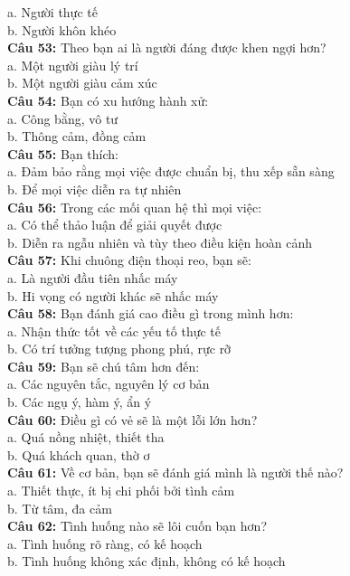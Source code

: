 \begin{multicols}{2}
a. Người thực tế \\
b. Người khôn khéo \\
\textbf{Câu 53:} Theo bạn ai là người đáng được khen ngợi hơn? \\
a. Một người giàu lý trí \\
b. Một người giàu cảm xúc \\
\textbf{Câu 54:} Bạn có xu hướng hành xử: \\
a. Công bằng, vô tư \\
b. Thông cảm, đồng cảm \\
\textbf{Câu 55:} Bạn thích: \\
a. Đảm bảo rằng mọi việc được chuẩn bị, thu xếp sẵn sàng \\
b. Để mọi việc diễn ra tự nhiên \\
\textbf{Câu 56:} Trong các mối quan hệ thì mọi việc: \\
a. Có thể thảo luận để giải quyết được \\
b. Diễn ra ngẫu nhiên và tùy theo điều kiện hoàn cảnh \\
\textbf{Câu 57:} Khi chuông điện thoại reo, bạn sẽ: \\
a. Là người đầu tiên nhấc máy \\
b. Hi vọng có người khác sẽ nhấc máy \\
\textbf{Câu 58:} Bạn đánh giá cao điều gì trong mình hơn: \\
a. Nhận thức tốt về các yếu tố thực tế \\
b. Có trí tưởng tượng phong phú, rực rỡ \\
\textbf{Câu 59:} Bạn sẽ chú tâm hơn đến: \\
a. Các nguyên tắc, nguyên lý cơ bản \\
b. Các ngụ ý, hàm ý, ẩn ý \\
\textbf{Câu 60:} Điều gì có vẻ sẽ là một lỗi lớn hơn? \\
a. Quá nồng nhiệt, thiết tha \\
b. Quá khách quan, thờ ơ \\
\textbf{Câu 61:} Về cơ bản, bạn sẽ đánh giá mình là người thế nào? \\
a. Thiết thực, ít bị chi phối bởi tình cảm \\
b. Từ tâm, đa cảm \\
\textbf{Câu 62:} Tình huống nào sẽ lôi cuốn bạn hơn? \\
a. Tình huống rõ ràng, có kế hoạch \\
b. Tình huống không xác định, không có kế hoạch \\

\end{multicols}
